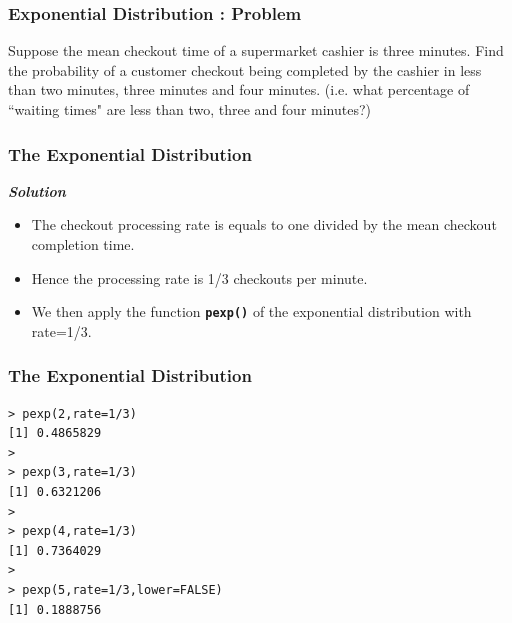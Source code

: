 \documentclass[MAIN.tex]{subfiles}
\begin{document}
\begin{frame}[fragile]
	\frametitle{Exponential Distribution : Problem}
	\large

Suppose the mean checkout time of a supermarket cashier is three minutes. Find the probability of a customer checkout being completed by the cashier in less than two minutes, three minutes and four minutes. 
(i.e. what percentage of ``waiting times" are less than two, three and four minutes?)
\end{frame}
\begin{frame}[fragile]
	\frametitle{The Exponential Distribution}
	\large
\textbf{\emph{Solution}} 
\begin{itemize}
\item The checkout processing rate is equals to one divided by the mean checkout completion time. 
\item Hence the processing rate is 1/3 checkouts per minute. 
\item We then apply the function \texttt{\textbf{pexp()}} of the exponential distribution with rate=1/3.
\end{itemize} 
\end{frame}
\begin{frame}[fragile]
	\frametitle{The Exponential Distribution}
	\large


\begin{framed}
\begin{verbatim}
> pexp(2,rate=1/3)
[1] 0.4865829
>
> pexp(3,rate=1/3)
[1] 0.6321206
>
> pexp(4,rate=1/3)
[1] 0.7364029
>
> pexp(5,rate=1/3,lower=FALSE)
[1] 0.1888756
\end{verbatim}
\end{framed}
\end{frame}
\end{document}
